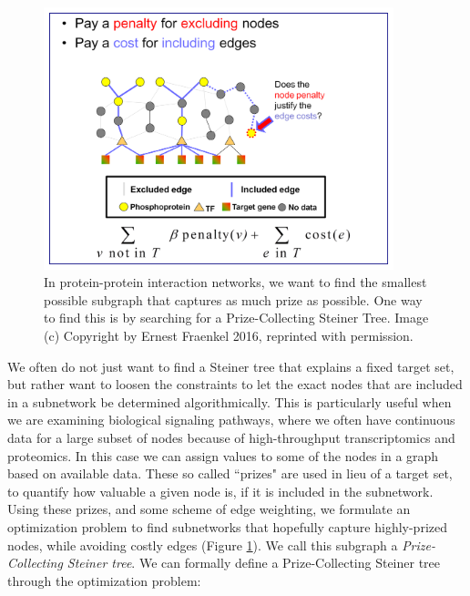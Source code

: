 \documentclass[12pt,twoside]{reedthesis}
\theoremstyle{definition}
\begin{document}
  \begin{figure}[!h]
    \begin{center}
      \includegraphics[width=4in]{PCST}
    \caption[Prize-Collecting Steiner Tree]{In protein-protein interaction networks, we want to find the smallest possible subgraph that captures as much prize as possible. One way to find this is by searching for a Prize-Collecting Steiner Tree. Image (c) Copyright by Ernest Fraenkel 2016, reprinted with permission.}
    \label{fig:PCST}
    \end{center}
  \end{figure}

  We often do not just want to find a Steiner tree that explains a fixed target set, but rather want to loosen the constraints to let the exact nodes that are included in a subnetwork be determined algorithmically. This is particularly useful when we are examining biological signaling pathways, where we often have continuous data for a large subset of nodes because of high-throughput transcriptomics and proteomics. In this case we can assign values to some of the nodes in a graph based on available data. These so called ``prizes" are used in lieu of a target set, to quantify how valuable a given node is, if it is included in the subnetwork. Using these prizes, and some scheme of edge weighting, we formulate an optimization problem to find subnetworks that hopefully capture highly-prized nodes, while avoiding costly edges (Figure \ref{fig:PCST}). We call this subgraph a \textit{Prize-Collecting Steiner tree}. We can formally define a Prize-Collecting Steiner tree through the optimization problem:\par

  \bigbreak
\end{document}
